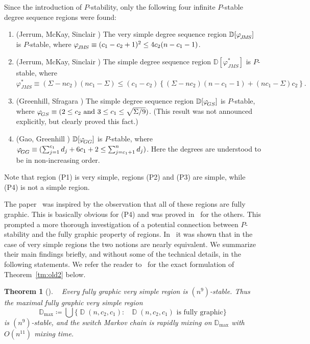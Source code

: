 \documentclass[11pt]{elsarticle}
\theoremstyle{plain}
\newtheorem{theorem}{Theorem}[section]
\theoremstyle{definition}
\def\mD{\mathbb{D}}
\def\ds{\rule{0pt}{1.5ex}}
\newcommand{\dd}[3]{\operatorname{\mathbb D}(#1,#2,#3)}
\newcommand{\jms}{\varphi^*_{J\!M\!S}}
\begin{document}
Since the introduction of $P$-stability, only the following four infinite $P$-stable degree sequence regions were found:
\begin{enumerate}[(P1)]
\item (Jerrum, McKay, Sinclair \cite{JMS92}) The very simple  degree sequence region $\mathbb D[{\varphi}_{\ds \! {J\!M\!S}}]$ is $P$-stable, where $\varphi_{\ds \! {J\!M\!S}}\equiv (c_1-c_2+1)^2 \le 4 c_2(n-c_1-1)$.
\item (Jerrum, McKay, Sinclair \cite{JMS92}) The simple  degree sequence region $\mathbb D[\jms]$ is $P$-stable, where $    {\jms} \equiv (\Sigma-nc_2) (nc_1-\Sigma)\le (c_1-c_2)\left\{(\Sigma-nc_2)(n-c_1-1)+ (nc_1-\Sigma)c_2\right\}.$
\item (Greenhill, Sfragara \cite{G18}) The  simple degree sequence region $\mathbb D[{\varphi}_{\ds \! {GS}}]$ is $P$-stable, where  $\varphi_{\ds \! {GS}}\equiv (2\le c_2\text{ and }  3\le c_1 \le \sqrt{\Sigma/9})$. (This result was not announced explicitly, but \cite[Lemma 2.5]{G18} clearly proved this fact.)
\item (Gao, Greenhill \cite{GG20}) $\mathbb D[{\varphi}_{\ds \! {GG}}]$ is $P$-stable, where  $\varphi_{\ds \! {GG}}\equiv (\sum_{j=1}^{c_1} d_j + 6c_1+2 \le \sum_{j=c_1+1}^n d_j)$.  Here the degrees are understood to be in non-increasing order.
\end{enumerate}
Note that region (P1) is very simple, regions (P2) and (P3) are simple, while (P4) is not a simple region.

The paper~\cite{fully} was inspired by the observation that all of these regions are fully graphic. This is basically obvious for (P4) and was proved in~\cite{fully} for the others. This prompted a more thorough investigation of a potential connection between $P$-stability and the fully graphic property of regions. In~\cite{fully} it was shown that in the case of very simple regions the two notions are nearly equivalent. We summarize their main findings briefly, and without some of the technical details, in the following statements. We refer the reader to~\cite{fully} for the exact formulation of Theorem~\ref{tm:old2} below.

\begin{theorem}[{\cite[Theorems 4.2, 4.4]{fully}}]\label{tm:old}~
Every fully graphic very simple region is $(n^9)$-stable. Thus the maximal fully graphic very simple region  	
\begin{displaymath}
\mD_{\max}\coloneqq\bigcup\{\dd{n}{c_2}{c_1}:\text{ $\dd{n}{c_2}{c_1}$ is fully graphic}\}
\end{displaymath}
is $(n^9)$-stable, and the switch Markov chain is rapidly mixing on $\mD_{\max}$ with $O(n^{11})$ mixing time.
\end{theorem}
\end{document}
